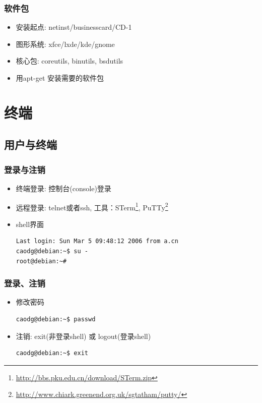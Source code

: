 \documentclass[compress]{beamer}
\begin{document}
\begin{frame}
    \frametitle{软件包}
    \begin{itemize}
        \item 安装起点: netinst/businesscard/CD-1
        \item 图形系统: xfce/lxde/kde/gnome
        \item 核心包: coreutils, binutils, bsdutils
        \item 用apt-get 安装需要的软件包
    \end{itemize}
\end{frame}

\section{终端}

\subsection{用户与终端}

\begin{frame}[containsverbatim]
\frametitle{登录与注销}
\begin{itemize}

\item 终端登录: 控制台(console)登录

\item 远程登录: \alert{telnet}或者\alert{ssh}, 工具：\alert{STerm}\footnote{\href{http://bbs.pku.edu.cn/download/STerm.zip}{http://bbs.pku.edu.cn/download/STerm.zip}},
\alert{PuTTy}\footnote{\href{http://www.chiark.greenend.org.uk/~sgtatham/putty/}{http://www.chiark.greenend.org.uk/{}sgtatham/putty/}}

\item shell界面

\begin{Verbatim}
Last login: Sun Mar 5 09:48:12 2006 from a.cn
caodg@debian:~$ su -
root@debian:~# 
\end{Verbatim}

\end{itemize}
\end{frame}

\begin{frame}[containsverbatim]
\frametitle{登录、注销}
\begin{itemize}

\item 修改密码

\begin{Verbatim}
caodg@debian:~$ passwd
\end{Verbatim}

\item 注销: \alert{exit}(非登录shell) 或 \alert{logout}(登录shell)

\begin{Verbatim}
caodg@debian:~$ exit
\end{Verbatim}

\end{itemize}
\end{frame}
\end{document}
